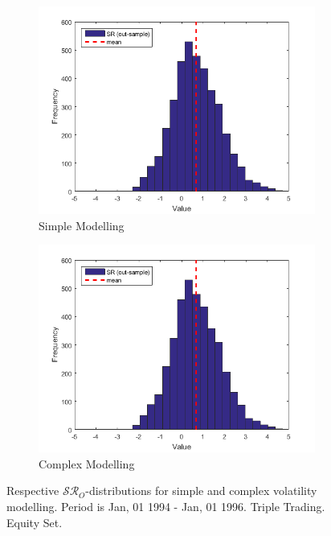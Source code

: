 \documentclass[11pt,a4,twosided,singlespacing,titlepagenumber=on]{scrreprt}
\numberwithin{equation}{chapter} %
\theoremstyle{remark}
\begin{document}
\begin{figure}[H]
    \centering
    \begin{subfigure}[t]{0.49\textwidth}
        \centering
        \includegraphics[width=1\textwidth]{res/params/1462_2192/sr}
        \caption{Simple Modelling}
    \end{subfigure}
    \begin{subfigure}[t]{0.49\textwidth}
        \centering
        \includegraphics[width=1\textwidth]{res/params/1462_2192/sr}
        \caption{Complex Modelling}
    \end{subfigure}
    \caption[]{Respective $\mathcal{SR}_O$-distributions for simple and complex volatility modelling. Period is Jan, 01 1994 - Jan, 01 1996. Triple Trading. Equity Set.}
    \label{fig:sharpe_ratio_comparison}
\end{figure}
\end{document}
